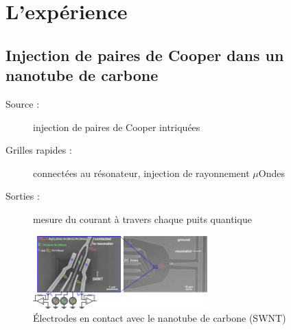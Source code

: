 \documentclass[8pt,a9paper]{beamer} \usepackage[utf8]{inputenc} \usepackage[francais]{babel} \usepackage[T1]{fontenc}
\begin{document}
\section{L'expérience}
\subsection{Injection de paires de Cooper dans un nanotube de carbone}
\begin{frame}
\begin{description}
    \item[Source :] injection de paires de Cooper intriquées
    \item[Grilles rapides :] connectées au résonateur, injection de rayonnement $\mu$Ondes
    \item[Sorties :] mesure du courant à travers chaque puits quantique 
\end{description}
\begin{figure}
    \begin{center}
        \includegraphics[width=0.6\textwidth]{Images/Expe_photo}
        \caption{Électrodes en contact avec le nanotube de carbone (SWNT)}
    \end{center}
\end{figure}
\end{frame}
\end{document}

